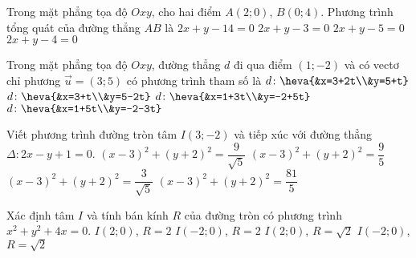 	
	\begin{ex}%
		Trong mặt phẳng tọa độ $Oxy$, cho hai điểm $A(2;0)$, $B(0;4)$. Phương trình tổng quát của đường thẳng $AB$ là
		\choice
		{$2x+y-14=0$}
		{$2x+y-3=0$}
		{$2x+y-5=0$}
		{\True $2x+y-4=0$}
	\end{ex}

	\begin{ex}%
		Trong mặt phẳng tọa độ $Oxy$, đường thẳng $d$ đi qua điểm $(1; -2)$ và có vectơ chỉ phương $\overrightarrow{u}=(3; 5)$ có phương trình tham số là 
		\choice
		{$d\colon\heva{&x=3+2t\\&y=5+t}$}
		{$d\colon\heva{&x=3+t\\&y=5-2t}$}
		{\True $d\colon \heva{&x=1+3t\\&y=-2+5t}$}
		{$d\colon \heva{&x=1+5t\\&y=-2-3t}$}
	\end{ex}	
	
	\begin{ex}%
		Viết phương trình đường tròn tâm $I\left( 3;-2 \right)$ và tiếp xúc với đường thẳng $\Delta \colon 2x-y+1=0$. 
		\choice
		{$\left( x-3 \right)^{2}+\left( y+2 \right)^{2}=\dfrac{9}{\sqrt{5}}$}
		{$\left( x-3 \right)^{2}+\left( y+2 \right)^{2}=\dfrac{9}{5}$}
		{$\left( x-3 \right)^{2}+\left( y+2 \right)^{2}=\dfrac{3}{\sqrt{5}}$}
		{\True $\left( x-3 \right)^{2}+\left( y+2 \right)^{2}=\dfrac{81}{5}$}
	\end{ex}

	\begin{ex}%
		Xác định tâm $I$ và tính bán kính $R$ của đường tròn có phương trình $x^2+y^2+4x=0$. 
		\choice
		{$I\left( 2;0 \right)$, $R=2$}
		{\True $I\left( -2;0 \right)$, $R=2$}
		{$I\left( 2;0 \right)$, $R=\sqrt{2}$}
		{$I\left( -2;0 \right)$, $R=\sqrt{2}$}
	\end{ex}
	

